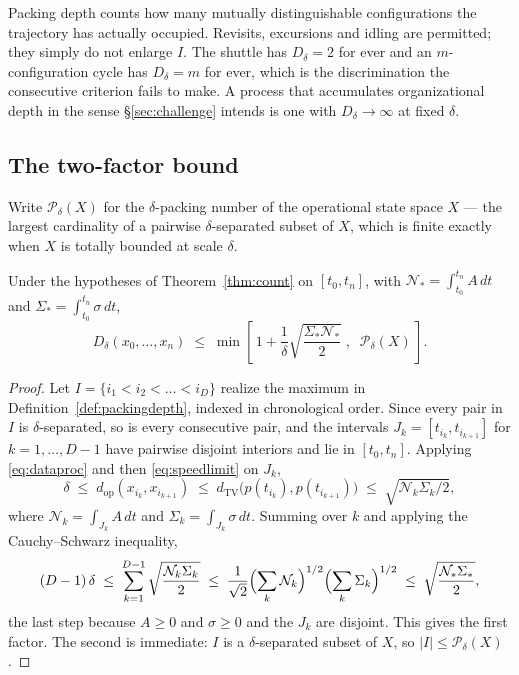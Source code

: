 Packing depth counts how many mutually distinguishable configurations the trajectory
has actually occupied. Revisits, excursions and idling are permitted; they simply do
not enlarge $I$. The shuttle has $D_\delta=2$ for ever and an $m$-configuration cycle
has $D_\delta=m$ for ever, which is the discrimination the consecutive criterion
fails to make. A process that accumulates organizational depth in the sense
\S\ref{sec:challenge} intends is one with $D_\delta\to\infty$ at fixed $\delta$.

\subsection{The two-factor bound}

Write $\mathcal{P}_\delta(X)$ for the $\delta$-packing number of the operational
state space $X$ --- the largest cardinality of a pairwise $\delta$-separated subset
of $X$, which is finite exactly when $X$ is totally bounded at scale $\delta$.

\begin{theorem}
\label{thm:twofactor}
Under the hypotheses of Theorem~\ref{thm:count} on $[t_0,t_n]$, with
$\mathcal{N}_*=\int_{t_0}^{t_n}\! A\,dt$ and
$\Sigma_*=\int_{t_0}^{t_n}\!\sigma\,dt$,
\begin{equation}
\label{eq:twofactor}
  D_\delta(x_0,\dots,x_n)
  \;\le\;
  \min\left[\,
    1+\frac{1}{\delta}\sqrt{\frac{\Sigma_*\mathcal{N}_*}{2}}
    \;,\;\;
    \mathcal{P}_\delta(X)
  \,\right].
\end{equation}
\end{theorem}

\begin{proof}
Let $I=\{i_1<i_2<\dots<i_D\}$ realize the maximum in
Definition~\ref{def:packingdepth}, indexed in chronological order. Since every pair
in $I$ is $\delta$-separated, so is every consecutive pair, and the intervals
$J_k=[t_{i_k},t_{i_{k+1}}]$ for $k=1,\dots,D-1$ have pairwise disjoint interiors and
lie in $[t_0,t_n]$. Applying \eqref{eq:dataproc} and then \eqref{eq:speedlimit} on
$J_k$,
\begin{equation}
  \delta
  \;\le\; d_{\mathrm{op}}(x_{i_k},x_{i_{k+1}})
  \;\le\; d_{\mathrm{TV}}\bigl(p(t_{i_k}),p(t_{i_{k+1}})\bigr)
  \;\le\; \sqrt{\mathcal{N}_k\Sigma_k/2},
\end{equation}
where $\mathcal{N}_k=\int_{J_k}\!A\,dt$ and $\Sigma_k=\int_{J_k}\!\sigma\,dt$.
Summing over $k$ and applying the Cauchy--Schwarz inequality,
\begin{equation}
  (D-1)\,\delta
  \;\le\; \sum_{k=1}^{D-1}\sqrt{\frac{\mathcal{N}_k\Sigma_k}{2}}
  \;\le\; \frac{1}{\sqrt2}
    \Bigl(\sum_{k}\mathcal{N}_k\Bigr)^{1/2}
    \Bigl(\sum_{k}\Sigma_k\Bigr)^{1/2}
  \;\le\; \sqrt{\frac{\mathcal{N}_*\Sigma_*}{2}},
\end{equation}
the last step because $A\ge0$ and $\sigma\ge0$ and the $J_k$ are disjoint. This gives
the first factor. The second is immediate: $I$ is a $\delta$-separated subset of $X$,
so $|I|\le\mathcal{P}_\delta(X)$.
\end{proof}


